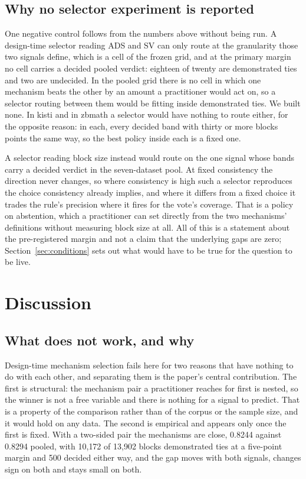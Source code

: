 \documentclass[11pt]{article}
\begin{document}
\subsection{Why no selector experiment is reported}
\label{sec:no-selector}

One negative control follows from the numbers above without being run. A
design-time selector reading ADS and SV can only route at the granularity
those two signals define, which is a cell of the frozen grid, and at the
primary margin no cell carries a decided pooled verdict: eighteen of twenty
are demonstrated ties and two are undecided. In the pooled grid there is no
cell in which one mechanism beats the other by an amount a practitioner would
act on, so a selector routing between them would be fitting inside
demonstrated ties. We built none. In kisti and in zbmath a selector would have
nothing to route either, for the opposite reason: in each, every decided band
with thirty or more blocks points the same way, so the best policy inside each
is a fixed one.

A selector reading block size instead would route on the one signal whose bands carry a decided verdict in the seven-dataset pool. At fixed consistency the direction never changes, so
where consistency is high such a selector reproduces the choice consistency
already implies, and where it differs from a fixed choice it trades the rule's
precision where it fires for the vote's coverage. That is a policy on
abstention, which a practitioner can set directly from the two mechanisms'
definitions without measuring block size at all. All of this is a statement
about the pre-registered margin and not a claim that the underlying gaps are
zero; Section~\ref{sec:conditions} sets out what would have to be true for the
question to be live.

\section{Discussion}
\label{sec:discussion}

\subsection{What does not work, and why}
\label{sec:what-fails}

Design-time mechanism selection fails here for two reasons that have nothing
to do with each other, and separating them is the paper's central
contribution. The first is structural: the mechanism pair a practitioner reaches for
first is nested, so the winner is not a free variable and there is nothing for
a signal to predict. That is a property of the comparison rather than of the
corpus or the sample size, and it would hold on any data. The second is
empirical and appears only once the first is fixed. With a two-sided pair the
mechanisms are close, 0.8244 against 0.8294 pooled, with 10{,}172 of 13{,}902
blocks demonstrated ties at a five-point margin and 500 decided either way,
and the gap moves with both signals, changes sign on both and stays small on
both.
\end{document}
